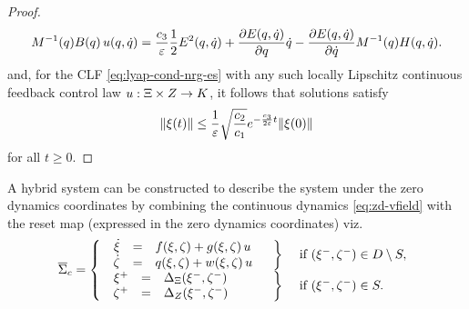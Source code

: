 \begin{proof}
  \begin{align*}
    M^{-1}(q) B(q) \, u(q, \dot{q}) = \frac{c_{3}}{\varepsilon} \frac{1}{2}
    E^{2}(q, \dot{q}) + \frac{\partial{E(q, \dot{q})}}{\partial{q}} \dot{q} - \frac{\partial{E(q, \dot{q})}}{\partial{\dot{q}}}
    M^{-1}(q) H(q, \dot{q}).
  \end{align*}
  and, for the CLF \eqref{eq:lyap-cond-nrg-es} with any such locally Lipschitz
  continuous feedback control law $u : \Xi \times Z \to K$, it follows that
  solutions satisfy
  \begin{align}
    \label{eq:xt-bounds}
    \| \xi(t) \| \leq \frac{1}{\varepsilon} \sqrt{\frac{c_{2}}{c_{1}}}
    e^{-\frac{c_{3}}{2\varepsilon} t} \| \xi(0) \|
  \end{align}
  for all $t \geq 0.$
\end{proof}

A hybrid system can be constructed to describe the system under the zero
dynamics coordinates by combining the continuous dynamics \eqref{eq:zd-vfield}
with the reset map (expressed in the zero dynamics coordinates) viz.
%
\begin{align}
  \label{eq:zd-hcsys}
  \HCSbar= \left\{
    \begin{array}{l c l}
      \begin{array}{r c l}
        {\dot \zdx} &=& f\argsxz + g\argsxz \, \uu\\
        {\dot \zdz} &=& q\argsxz + w\argsxz \, \uu
      \end{array} &
      \left.\vphantom{
          \begin{array}{r c l}
            {\dot \zdx} &=& f\argsxz + g\argsxz \, \uu\\
            {\dot \zdz} &=& q\argsxz + w\argsxz \, \uu
          \end{array}}\right\} & \mbox{ if } \argsxzm \in \D \setminus \Guard,\\
      \begin{array}{r c l}
        \zdx^{+} &=& \DeltaX(\zdx^{-}, \zdz^{-})\\
        \zdz^{+} &=& \DeltaZ(\zdx^{-}, \zdz^{-})
      \end{array}
      & \left.\vphantom{\begin{array}{r c l}
            \zdx^{+} &=& \DeltaX(\zdx^{-}, \zdz^{-})\\
            \zdz^{+} &=& \DeltaZ(\zdx^{-}, \zdz^{-})
          \end{array}}\right\}
      & \mbox{ if } \argsxzm \in \Guard.
    \end{array}\right.
\end{align}
